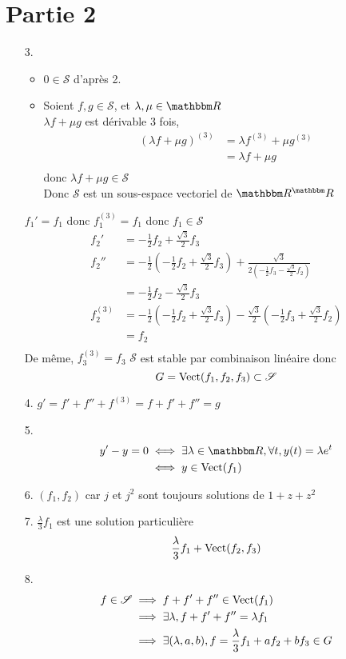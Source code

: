 \section*{Partie 2}
\begin{enumerate}
	\item[3.]
		\begin{itemize}
			\item $ 0 \in \mathcal{S}$ d'après 2.
			\item Soient $f,g \in \mathcal{S}$, et $\lambda, \mu \in \R$ \\
				$\lambda f + \mu g$ est dérivable 3 fois, 
				\begin{align*}
					(\lambda f+ \mu g)^{(3)} &= \lambda f^{(3)}+ \mu g^{(3)}\\
					&= \lambda f + \mu g \\
				\end{align*}
				donc $\lambda f + \mu g \in \mathcal{S}$ \\
				Donc $\mathcal{S}$ est un sous-espace vectoriel de $\R^\R$
		\end{itemize}
		$f_1' = f_1$ donc $f_1^{(3)} = f_1$ donc $f_1 \in \mathcal{S}$ \\
		\begin{align*}
			f_2' &= -\frac{1}{2}f_2 + \frac{\sqrt{3}}{2} f_3 \\
			f_2'' &= -\frac{1}{2}\left( -\frac{1}{2}f_2 + \frac{\sqrt{3}}{2}f_3 \right) + \frac{\sqrt{3}}{2\left( -\frac{1}{2} f_3 - \frac{\sqrt{3}}{2}f_2 \right)} \\
			&= -\frac{1}{2}f_2 - \frac{\sqrt{3}}{2}f_3 \\
			f_2^{(3)} &= -\frac{1}{2}\left( -\frac{1}{2}f_2 + \frac{\sqrt{3}}{2}f_3 \right) - \frac{\sqrt{3}}{2}\left( -\frac{1}{2}f_3 + \frac{\sqrt{3}}{2} f_2 \right)  \\
			&= f_2 \\
		\end{align*}
		De même, $f_3^{(3)} = f_3$ 
		$\mathcal{S}$ est stable par combinaison linéaire donc \[
			G = \operatorname{Vect}(f_1, f_2, f_3) \subset \mathcal{S}
		\]
	\item[4.] $g' = f'+ f'' + f^{(3)} = f + f' + f'' = g$ 
	\item[5.]
		 \begin{align*}
			 y' - y = 0 &\iff \exists \lambda \in \R, \forall t, y(t) = \lambda e^{t}\\
									&\iff y \in \Vect(f_1)
		\end{align*}
	\item[6.]
		$(f_1,f_2)$ car $j$ et $j^2$ sont toujours solutions de $1+z+z^2$ 
	\item[7.] $\frac{\lambda}{3}f_1$ est une solution particulière \[
			\frac{\lambda}{3}f_1 + \operatorname{Vect}(f_2, f_3)
		\]
	\item[8.]
		\begin{align*}
			f \in \mathcal{S} &\implies f + f' + f'' \in \operatorname{Vect}(f_1)\\
												&\implies \exists \lambda, f+f'+f'' = \lambda f_1\\
												&\implies \exists (\lambda,a,b), f = \frac{\lambda}{3}f_1 + af_2 + bf_3 \in G
		\end{align*}
\end{enumerate}
